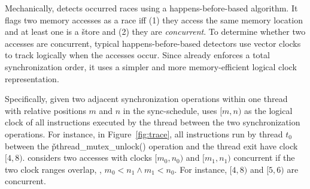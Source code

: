 

Mechanically, \peregrine detects occurred races using a happens-before-based
algorithm.  It flags two memory accesses as a race iff (1) they access the
same memory location and at least one is a \v{store} and (2) they are
\emph{concurrent}.  To determine whether two accesses are concurrent,
typical happens-before-based detectors use vector
clocks~\cite{vectorclock} to track logically when the accesses occur.
Since \peregrine already enforces a total synchronization order, it uses a
simpler and more memory-efficient logical clock representation.

Specifically, given two adjacent synchronization operations within one
thread with relative positions $m$ and $n$ in the sync-schedule, \peregrine uses $[m,n)$ as
  the logical clock of all instructions executed by the thread between the
  two synchronization operations.  For instance, in
  Figure~\ref{fig:trace}, all instructions run by thread $t_0$
  between the \v{pthread\_mutex\_unlock()} operation and the thread exit have
  clock $[4, 8)$.
    \peregrine considers two accesses with clocks $[m_0, n_0)$
      and $[m_1, n_1)$ concurrent if the two clock ranges overlap, \ie,
        $m_0 < n_1 \wedge m_1 < n_0$.  For instance, $[4, 8)$ and $[5,
            6)$ are concurrent.

